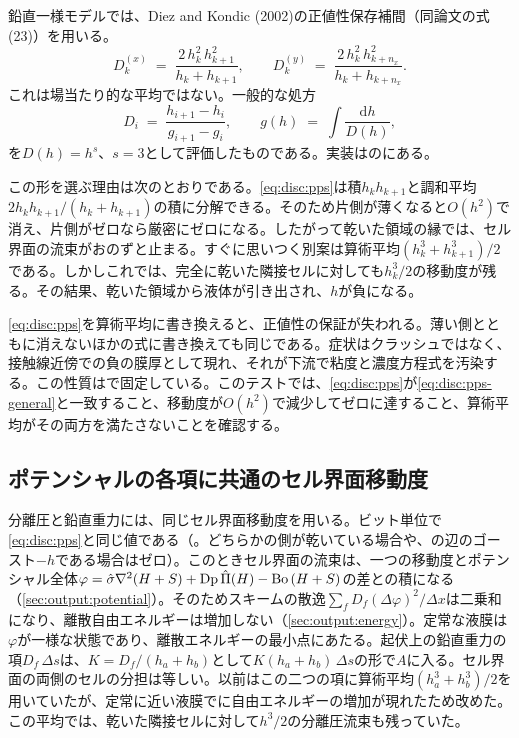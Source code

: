 鉛直一様モデルでは、Diez and Kondic (2002)の正値性保存補間（同論文の式(23)）を用いる。
%
\begin{equation}
  D_{k}^{(x)} \;=\; \frac{2\,h_{k}^{2}\,h_{k+1}^{2}}{h_{k} + h_{k+1}},
  \qquad
  D_{k}^{(y)} \;=\; \frac{2\,h_{k}^{2}\,h_{k+n_x}^{2}}{h_{k} + h_{k+n_x}} .
  \label{eq:disc:pps}
\end{equation}
%
これは場当たり的な平均ではない。一般的な処方
%
\begin{equation}
  D_{i} \;=\; \frac{h_{i+1} - h_{i}}{g_{i+1} - g_{i}},
  \qquad
  g(h) \;=\; \int \frac{\mathrm{d}h}{D(h)} ,
  \label{eq:disc:pps-general}
\end{equation}
%
を$D(h) = h^{s}$、$s = 3$として評価したものである。実装はのにある。

この形を選ぶ理由は次のとおりである。\cref{eq:disc:pps}は積$h_k h_{k+1}$と調和平均$2h_k h_{k+1}/(h_k + h_{k+1})$の積に分解できる。そのため片側が薄くなると$O(h^{2})$で消え、片側がゼロなら厳密にゼロになる。したがって乾いた領域の縁では、セル界面の流束がおのずと止まる。すぐに思いつく別案は算術平均$(h_k^{3} + h_{k+1}^{3})/2$である。しかしこれでは、完全に乾いた隣接セルに対しても$h_k^{3}/2$の移動度が残る。その結果、乾いた領域から液体が引き出され、$h$が負になる。

\begin{warn}[この式を単純化してはならない]
\cref{eq:disc:pps}を算術平均に書き換えると、正値性の保証が失われる。薄い側とともに消えないほかの式に書き換えても同じである。症状はクラッシュではなく、接触線近傍での負の膜厚として現れ、それが下流で粘度と濃度方程式を汚染する。この性質はで固定している。このテストでは、\cref{eq:disc:pps}が\cref{eq:disc:pps-general}と一致すること、移動度が$O(h^{2})$で減少してゼロに達すること、算術平均がその両方を満たさないことを確認する。
\end{warn}

\subsection{ポテンシャルの各項に共通のセル界面移動度}
\label{sec:disc:positivity-one}

分離圧と鉛直重力には、同じセル界面移動度を用いる。ビット単位で\cref{eq:disc:pps}と同じ値である（。どちらかの側が乾いている場合や、の辺のゴースト$-h$である場合はゼロ）。このときセル界面の流束は、一つの移動度とポテンシャル全体$\varphi = \hat\sigma\nabla^2(H+S) + \mathrm{Dp}\,\hat{\Pi}(H) - \mathrm{Bo}\,(H+S)$の差との積になる（\cref{sec:output:potential}）。そのためスキームの散逸$\sum_f D_f(\Delta\varphi)^2/\Delta x$は二乗和になり、離散自由エネルギーは増加しない（\cref{sec:output:energy}）。定常な液膜は$\varphi$が一様な状態であり、離散エネルギーの最小点にあたる。起伏上の鉛直重力の項$D_f\,\Delta s$は、$K = D_f/(h_a + h_b)$として$K(h_a + h_b)\,\Delta s$の形で$A$に入る。セル界面の両側のセルの分担は等しい。以前はこの二つの項に算術平均$(h_a^3 + h_b^3)/2$を用いていたが、定常に近い液膜でに自由エネルギーの増加が現れたため改めた。この平均では、乾いた隣接セルに対して$h^3/2$の分離圧流束も残っていた。


